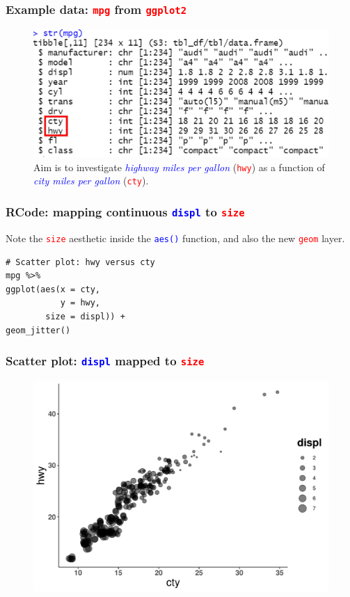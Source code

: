\documentclass{beamer}
\begin{document}
\begin{frame}\frametitle{Example data: \texttt{\textcolor{red}{mpg}} from \texttt{\textcolor{red}{ggplot2}}}
\begin{figure}
\includegraphics[width=0.99\linewidth]{PlotsLec2/mpg}
\caption{{\small Aim is to investigate \textit{\textcolor{blue}{highway miles per gallon}} (\texttt{\textcolor{red}{hwy}}) as a function of \textit{\textcolor{blue}{city miles per gallon}} (\texttt{\textcolor{red}{cty}}).}}
\end{figure}
\end{frame}

\begin{frame}[fragile]\frametitle{RCode: mapping continuous \texttt{\textcolor{blue}{displ}} to \texttt{\textcolor{red}{size}}}
{\Large Note the \textcolor{red}{\texttt{size}} aesthetic inside the \textcolor{blue}{\texttt{aes()}} function, and also the new \textcolor{red}{\texttt{geom}} layer.}

\lstset{basicstyle=\Large\ttfamily}
\begin{lstlisting}
# Scatter plot: hwy versus cty
mpg %>%
ggplot(aes(x = cty, 
           y = hwy,
        size = displ)) +
geom_jitter()
\end{lstlisting}
\end{frame}

\begin{frame}\frametitle{Scatter plot: \texttt{\textcolor{blue}{displ}} mapped to \texttt{\textcolor{red}{size}}}
\begin{figure}
\includegraphics[width=0.99\linewidth]{PlotsLec2/displ_to_size}
\end{figure}
\end{frame}
\end{document}

